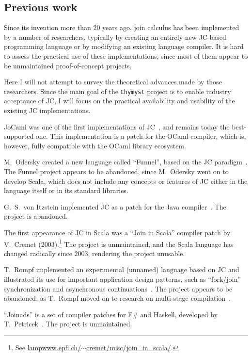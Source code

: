 \documentclass[sigplan,10pt,review,anonymous]{acmart}\settopmatter{printfolios=true}
\begin{document}
\subsection{Previous work}

Since its invention more than 20 years ago, join calculus has been
implemented by a number of researchers, typically by creating an entirely
new JC-based programming language or by modifying an existing language
compiler. It is hard to assess the practical use of these
implementations, since most of them appear to be unmaintained proof-of-concept
projects. 

Here I will not attempt to survey the theoretical advances made by
those researchers. Since the main goal of the \texttt{Chymyst} project
is to enable industry acceptance of JC, I will focus on the practical
availability and usability of the existing JC implementations.

JoCaml was one of the first implementations of JC~\citep{FouEA2003},
and remains today the best-supported one. This implementation is a
patch for the OCaml compiler, which is, however, fully compatible
with the OCaml library ecosystem. 

M.~Odersky created a new language called ``Funnel'', based on the
JC paradigm~\citep{Ode2000}. The Funnel project appears to be abandoned,
since M.~Odersky went on to develop Scala, which does not include
any concepts or features of JC \textemdash{} either in the language
itself or in its standard libraries.

G.~S.~von Itzstein implemented JC as a patch for the Java compiler~\citep{Von2004}.
The project is abandoned.

The first appearance of JC in Scala was a \textquotedblleft Join in
Scala\textquotedblright{} compiler patch by V.~Cremet (2003).\footnote{ See \href{http://lampwww.epfl.ch/~cremet/misc/join_in_scala/index.html}{lampwww.epfl.ch/$\sim$cremet/misc/join\_{}in\_{}scala/}.}
The project is unmaintained, and the Scala language has changed radically
since 2003, rendering the project unusable.

T.~Rompf implemented an experimental (unnamed) language based on
JC and illustrated its use for important application design patterns,
such as ``fork/join'' synchronization and asynchronous continuations~\citep{Rom2007}.
The project appears to be abandoned, as T.~Rompf moved on to research
on multi-stage compilation~\citep{Rom2012}.

``Joinads'' is a set of compiler patches for F\# and Haskell, developed
by T.~Petricek~\citep{PetSym2011}. The project is unmaintained.
\end{document}
